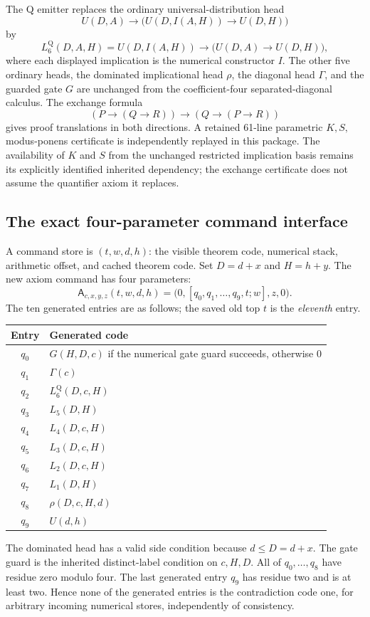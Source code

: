 The Q emitter replaces the ordinary universal-distribution head
\[
 U(D,A)\longrightarrow
       \bigl(U(D,I(A,H))\longrightarrow U(D,H)\bigr)
\]
by
\[
 L_6^{\mathrm Q}(D,A,H)=
 U(D,I(A,H))\longrightarrow
       \bigl(U(D,A)\longrightarrow U(D,H)\bigr),
 \tag{Q}
\]
where each displayed implication is the numerical constructor $I$.
The other five ordinary heads, the dominated implicational head $\rho$,
the diagonal head $\Gamma$, and the guarded gate $G$ are unchanged from
the coefficient-four separated-diagonal calculus. The exchange formula
\[
 (P\longrightarrow(Q\longrightarrow R))\longrightarrow
       (Q\longrightarrow(P\longrightarrow R))
\]
gives proof translations in both directions. A retained 61-line
parametric $K,S,$ modus-ponens certificate is independently replayed in
this package. The availability of $K$ and $S$ from the unchanged restricted
implication basis remains its explicitly identified inherited dependency;
the exchange certificate does not assume the quantifier axiom it replaces.

\subsection{The exact four-parameter command interface}

A command store is $(t,w,d,h)$: the visible theorem code, numerical stack,
arithmetic offset, and cached theorem code. Set $D=d+x$ and $H=h+y$.
The new axiom command has four parameters:
\[
 \mathsf A_{c,x,y,z}(t,w,d,h)
       =\bigl(0,[q_0,q_1,\ldots,q_9,t;w],z,0\bigr).
 \tag{A}
\]
The ten generated entries are as follows; the saved old top $t$ is the
\emph{eleventh} entry.
\begin{center}
\begin{tabular}{cl}
\toprule
Entry & Generated code\\
\midrule
$q_0$ & $G(H,D,c)$ if the numerical gate guard succeeds, otherwise $0$\\
$q_1$ & $\Gamma(c)$\\
$q_2$ & $L_6^{\mathrm Q}(D,c,H)$\\
$q_3$ & $L_5(D,H)$\\
$q_4$ & $L_4(D,c,H)$\\
$q_5$ & $L_3(D,c,H)$\\
$q_6$ & $L_2(D,c,H)$\\
$q_7$ & $L_1(D,H)$\\
$q_8$ & $\rho(D,c,H,d)$\\
$q_9$ & $U(d,h)$\\
\bottomrule
\end{tabular}
\end{center}
The dominated head has a valid side condition because $d\leq D=d+x$.
The gate guard is the inherited distinct-label condition on $c,H,D$.
All of $q_0,\ldots,q_8$ have residue zero modulo four. The last generated
entry $q_9$ has residue two and is at least two. Hence none of the generated
entries is the contradiction code one, for arbitrary incoming numerical
stores, independently of consistency.

